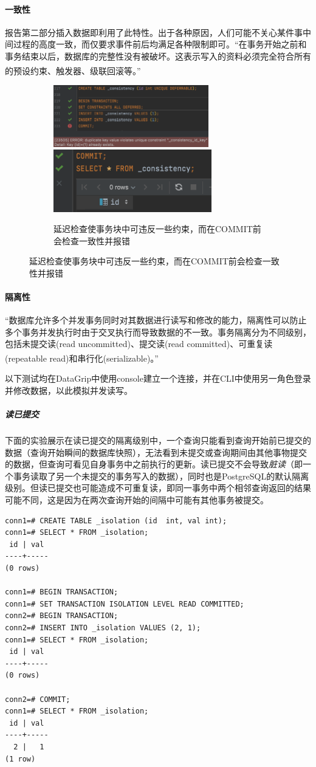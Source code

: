 \paragraph{一致性} 报告第二部分插入数据即利用了此特性。出于各种原因，人们可能不关心某件事中间过程的高度一致，而仅要求事件前后均满足各种限制即可。“在事务开始之前和事务结束以后，数据库的完整性没有被破坏。这表示写入的资料必须完全符合所有的预设约束、触发器、级联回滚等。”\textsuperscript{\cite{acid-wiki}}
\begin{figure}[!h]
	\centering
	\begin{subfigure}[b]{0.9\textwidth}
		\centerline{\includegraphics[height=2.7cm]{./sp/trs6}\qquad\includegraphics[height=2.7cm]{./sp/trs7}}
		\caption{延迟检查使事务块中可违反一些约束，而在COMMIT前会检查一致性并报错}
	\end{subfigure}
\end{figure}

\paragraph{隔离性} “数据库允许多个并发事务同时对其数据进行读写和修改的能力，隔离性可以防止多个事务并发执行时由于交叉执行而导致数据的不一致。事务隔离分为不同级别，包括未提交读(read uncommitted)、提交读(read committed)、可重复读(repeatable read)和串行化(serializable)。”\textsuperscript{\cite{acid-wiki}}
\par 以下测试均在DataGrip中使用console建立一个连接，并在CLI中使用另一角色登录并修改数据，以此模拟并发读写。
\subparagraph{读已提交} 下面的实验展示在读已提交的隔离级别中，一个查询只能看到查询开始前已提交的数据（查询开始瞬间的数据库快照），无法看到未提交或查询期间由其他事物提交的数据，但查询可看见自身事务中之前执行的更新。读已提交不会导致\emph{脏读}（即一个事务读取了另一个未提交的事务写入的数据），同时也是PostgreSQL的默认隔离级别。但读已提交也可能造成不可重复读，即同一事务中两个相邻查询返回的结果可能不同，这是因为在两次查询开始的间隔中可能有其他事务被提交。
\begin{lstlisting}
conn1=# CREATE TABLE _isolation (id  int, val int);
conn1=# SELECT * FROM _isolation;
 id | val 
----+-----
(0 rows)

conn1=# BEGIN TRANSACTION;
conn1=# SET TRANSACTION ISOLATION LEVEL READ COMMITTED;
conn2=# BEGIN TRANSACTION;
conn2=# INSERT INTO _isolation VALUES (2, 1);
conn1=# SELECT * FROM _isolation;
 id | val 
----+-----
(0 rows)

conn2=# COMMIT;
conn1=# SELECT * FROM _isolation;
 id | val 
----+-----
  2 |   1
(1 row)
\end{lstlisting}
\vspace{-2em}

